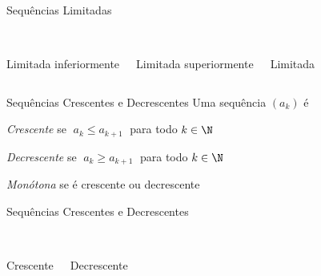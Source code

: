 \begin{frame}{Sequências Limitadas}
\begin{columns}
  \begin{center}
    \scalebox{0.9}{} \\[5mm]
    Limitada inferiormente
  \end{center}
  \pause
  \begin{center}
    \scalebox{0.9}{} \\[5mm]
    Limitada superiormente
  \end{center}
  \pause
  \begin{center}
    \scalebox{0.9}{} \\[5mm]
    Limitada
  \end{center}
\end{columns}
\end{frame}

\begin{frame}{Sequências Crescentes e Decrescentes}
	Uma sequência $(a_k)$ é

	\vspace{\baselineskip}
	\emph{Crescente}   \tabto{30mm} se \emph{$\;a_k \leq a_{k+1}\;$} para todo $k\in\N$

	\pause
	\vspace{\baselineskip}
	\emph{Decrescente} \tabto{30mm} se \emph{$\;a_k \geq a_{k+1}\;$} para todo $k\in\N$

	\pause
	\vspace{\baselineskip}
	\emph{Monótona}    \tabto{30mm} se é crescente ou decrescente
\end{frame}


\begin{frame}{Sequências Crescentes e Decrescentes}
  \begin{columns}
    \begin{center}
      \scalebox{0.9}{} \\[5mm]
      Crescente
    \end{center}
    \pause
    \begin{center}
      \scalebox{0.9}{} \\[5mm]
      Decrescente
    \end{center}
  \end{columns}
\end{frame}

